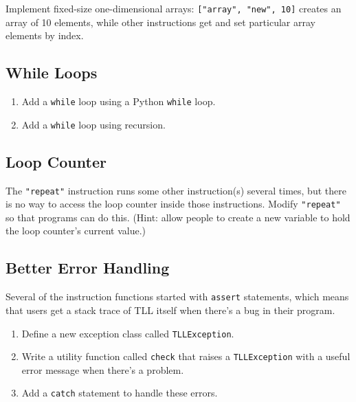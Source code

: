 \documentclass{scrbook}
\begin{document}
Implement fixed-size one-dimensional arrays:
\texttt{["array", "new", 10]} creates an array of 10 elements,
while other instructions get and set particular array elements by index.

\subsection*{While Loops}

\begin{enumerate}

\item 

Add a \texttt{while} loop using a Python \texttt{while} loop.



\item 

Add a \texttt{while} loop using recursion.



\end{enumerate}

\subsection*{Loop Counter}


The \texttt{"repeat"} instruction runs some other instruction(s) several times,
but there is no way to access the loop counter inside those instructions.
Modify \texttt{"repeat"} so that programs can do this.
(Hint: allow people to create a new variable to hold the loop counter's current value.)

\subsection*{Better Error Handling}


Several of the instruction functions started with \texttt{assert} statements,
which means that users get a stack trace of TLL itself
when there's a bug in their program.

\begin{enumerate}

\item 

Define a new exception class called \texttt{TLLException}.



\item 

Write a utility function called \texttt{check}
    that raises a \texttt{TLLException} with a useful error message
    when there's a problem.



\item 

Add a \texttt{catch} statement to handle these errors.



\end{enumerate}
\end{document}
